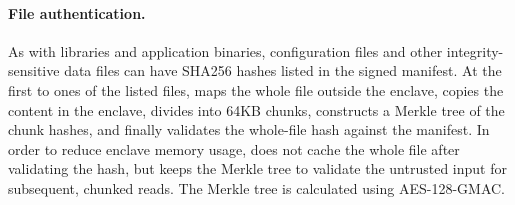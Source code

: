 \paragraph{File authentication.}
As with libraries and application binaries,
configuration files and other integrity-sensitive data files can
have SHA256 hashes listed in the signed manifest.
At the first  to ones of the listed files,
\graphenesgx{} maps the whole file outside the enclave, copies the content in the enclave, divides into 64KB chunks, 
constructs a Merkle tree of the chunk hashes, 
and finally validates the whole-file hash against the manifest.
In order to reduce enclave memory usage, \graphenesgx{} does not cache the whole file after validating the hash, but keeps the Merkle tree to
validate the untrusted input for subsequent, chunked reads. %
The Merkle tree is calculated %
using AES-128-GMAC. %




